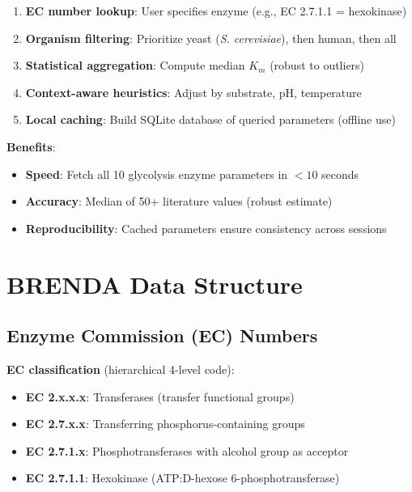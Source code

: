 \begin{enumerate}
    \item \textbf{EC number lookup}: User specifies enzyme (e.g., EC 2.7.1.1 = hexokinase)
    \item \textbf{Organism filtering}: Prioritize yeast (\textit{S. cerevisiae}), then human, then all
    \item \textbf{Statistical aggregation}: Compute median $K_m$ (robust to outliers)
    \item \textbf{Context-aware heuristics}: Adjust by substrate, pH, temperature
    \item \textbf{Local caching}: Build SQLite database of queried parameters (offline use)
\end{enumerate}

\textbf{Benefits}:

\begin{itemize}
    \item \textbf{Speed}: Fetch all 10 glycolysis enzyme parameters in $<10$ seconds
    \item \textbf{Accuracy}: Median of 50+ literature values (robust estimate)
    \item \textbf{Reproducibility}: Cached parameters ensure consistency across sessions
\end{itemize}

\section{BRENDA Data Structure}
\label{sec:brenda-data-structure}

\subsection{Enzyme Commission (EC) Numbers}
\label{subsec:ec-numbers}

\textbf{EC classification} (hierarchical 4-level code):

\begin{itemize}
    \item \textbf{EC 2.x.x.x}: Transferases (transfer functional groups)
    \item \textbf{EC 2.7.x.x}: Transferring phosphorus-containing groups
    \item \textbf{EC 2.7.1.x}: Phosphotransferases with alcohol group as acceptor
    \item \textbf{EC 2.7.1.1}: Hexokinase (ATP:D-hexose 6-phosphotransferase)
\end{itemize}

